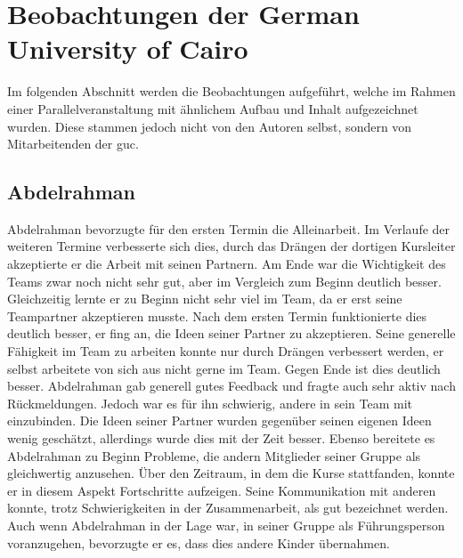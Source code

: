\section{Beobachtungen der German University of Cairo}
Im folgenden Abschnitt werden die Beobachtungen aufgeführt, welche im Rahmen einer Parallelveranstaltung mit ähnlichem Aufbau und Inhalt aufgezeichnet wurden. Diese stammen jedoch nicht von den Autoren selbst, sondern von Mitarbeitenden der \acrlong{guc}.\\

\subsection*{Abdelrahman}
Abdelrahman bevorzugte für den ersten Termin die Alleinarbeit. Im Verlaufe der weiteren Termine verbesserte sich dies, durch das Drängen der dortigen Kursleiter akzeptierte er die Arbeit mit seinen Partnern. Am Ende war die Wichtigkeit des Teams zwar noch nicht sehr gut, aber im Vergleich zum Beginn deutlich besser. Gleichzeitig lernte er zu Beginn nicht sehr viel im Team, da er erst seine Teampartner akzeptieren musste. Nach dem ersten Termin funktionierte dies deutlich besser, er fing an, die Ideen seiner Partner zu akzeptieren. Seine generelle Fähigkeit im Team zu arbeiten konnte nur durch Drängen verbessert werden, er selbst arbeitete von sich aus nicht gerne im Team. Gegen Ende ist dies deutlich besser. Abdelrahman gab generell gutes Feedback und fragte auch sehr aktiv nach Rückmeldungen. Jedoch war es für ihn schwierig, andere in sein Team mit einzubinden. Die Ideen seiner Partner wurden gegenüber seinen eigenen Ideen wenig geschätzt, allerdings wurde dies mit der Zeit besser. Ebenso bereitete es Abdelrahman zu Beginn Probleme, die andern Mitglieder seiner Gruppe als gleichwertig anzusehen. Über den Zeitraum, in dem die Kurse stattfanden, konnte er in diesem Aspekt Fortschritte aufzeigen. Seine Kommunikation mit anderen konnte, trotz Schwierigkeiten in der Zusammenarbeit, als gut bezeichnet werden. Auch wenn Abdelrahman in der Lage war, in seiner Gruppe als Führungsperson voranzugehen, bevorzugte er es, dass dies andere Kinder übernahmen.\\

